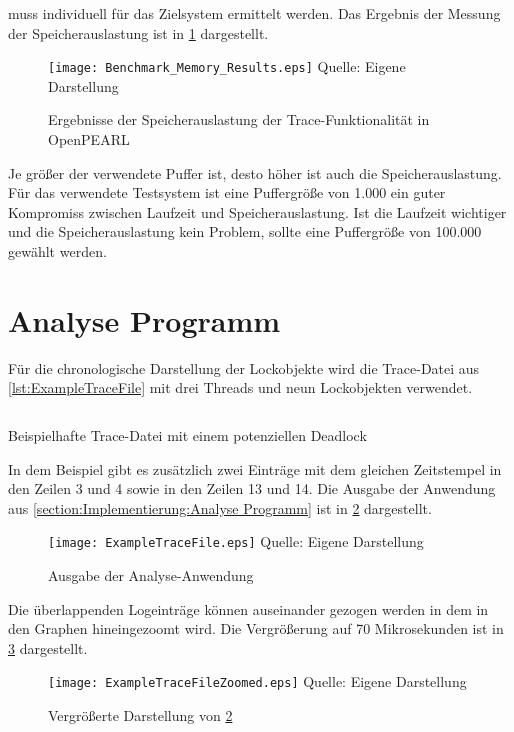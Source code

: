 muss individuell für das Zielsystem ermittelt werden. Das Ergebnis der Messung
der Speicherauslastung ist in \cref{fig:BenchmarkMemoryResults} dargestellt.
\begin{figure}[ht]
  \texttt{[image: Benchmark\_Memory\_Results.eps]}
  \footnotesize\sffamily Quelle: Eigene Darstellung
  \caption{Ergebnisse der Speicherauslastung der Trace-Funktionalität in OpenPEARL}
  \label{fig:BenchmarkMemoryResults}
\end{figure}
Je größer der verwendete Puffer ist, desto höher ist auch die
Speicherauslastung. Für das verwendete Testsystem ist eine Puffergröße von 1.000
ein guter Kompromiss zwischen Laufzeit und Speicherauslastung. Ist die Laufzeit
wichtiger und die Speicherauslastung kein Problem, sollte eine Puffergröße von
100.000 gewählt werden.

\section{Analyse Programm}
\label{section:ValidierungAnalyseProgramm}
Für die chronologische Darstellung der Lockobjekte wird die Trace-Datei aus
\cref{lst:ExampleTraceFile} mit drei Threads und neun Lockobjekten verwendet.
\begin{listing}[ht]
  \begin{minipage}[ht]{\linewidth}
    \begin{multicols}{3}
      \inputminted[linenos]{text}{./Examples/ExampleTraceFile.log}
    \end{multicols}
    \caption{Beispielhafte Trace-Datei mit einem potenziellen Deadlock}
    \label{lst:ExampleTraceFile}
  \end{minipage}
\end{listing}
In dem Beispiel gibt es zusätzlich zwei Einträge mit dem gleichen Zeitstempel in
den Zeilen 3 und 4 sowie in den Zeilen 13 und 14. Die Ausgabe der Anwendung aus
\cref{section:Implementierung:Analyse Programm} ist in
\cref{fig:LockTraceVisualization} dargestellt.
\begin{figure}[ht]
  \texttt{[image: ExampleTraceFile.eps]}
  \footnotesize\sffamily Quelle: Eigene Darstellung
  \caption{Ausgabe der Analyse-Anwendung}
  \label{fig:LockTraceVisualization}
\end{figure}

Die überlappenden Logeinträge können auseinander gezogen werden in dem in den
Graphen hineingezoomt wird. Die Vergrößerung auf 70 Mikrosekunden ist in
\cref{fig:LockTraceVisualizationZoomed} dargestellt.
\begin{figure}[ht]
  \texttt{[image: ExampleTraceFileZoomed.eps]}
  \footnotesize\sffamily Quelle: Eigene Darstellung
  \caption{Vergrößerte Darstellung von \cref{fig:LockTraceVisualization}}
  \label{fig:LockTraceVisualizationZoomed}
\end{figure}

